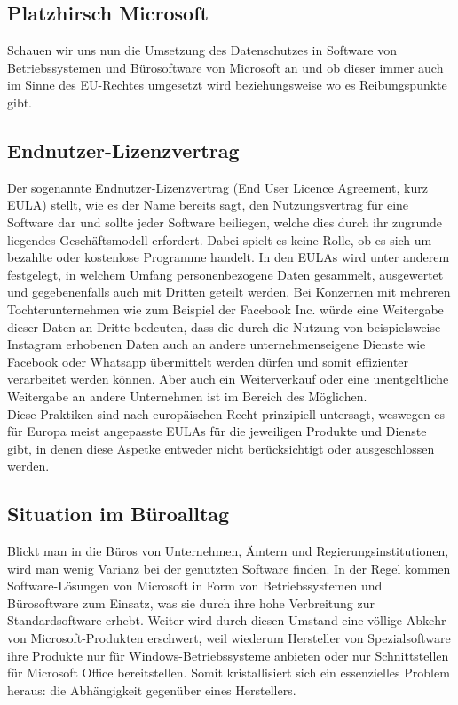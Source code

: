 \subsection{Platzhirsch Microsoft}
Schauen wir uns nun die Umsetzung des Datenschutzes in Software von Betriebssystemen und Bürosoftware von Microsoft an und ob dieser immer auch im Sinne des EU-Rechtes umgesetzt wird beziehungsweise wo es Reibungspunkte gibt.

\subsection{Endnutzer-Lizenzvertrag}
Der sogenannte Endnutzer-Lizenzvertrag (\glqq End User Licence Agreement\grqq{}, kurz EULA) stellt, wie es der Name bereits sagt, den Nutzungsvertrag für eine Software dar und sollte jeder Software beiliegen, welche dies durch ihr zugrunde liegendes Geschäftsmodell erfordert. Dabei spielt es keine Rolle, ob es sich um bezahlte oder kostenlose Programme handelt. In den \mbox{EULAs} wird unter anderem festgelegt, in welchem Umfang personenbezogene Daten gesammelt, ausgewertet und gegebenenfalls auch mit Dritten geteilt werden. Bei Konzernen mit mehreren Tochterunternehmen wie zum Beispiel der Facebook Inc. würde eine Weitergabe dieser Daten an Dritte bedeuten, dass die durch die Nutzung von beispielsweise Instagram erhobenen Daten auch an andere unternehmenseigene Dienste wie Facebook oder Whatsapp übermittelt werden dürfen und somit effizienter verarbeitet werden können. Aber auch ein Weiterverkauf oder eine unentgeltliche Weitergabe an andere Unternehmen ist im Bereich des Möglichen.\\
Diese Praktiken sind nach europäischen Recht prinzipiell untersagt, weswegen es für Europa meist angepasste EULAs für die jeweiligen Produkte und Dienste gibt, in denen diese Aspetke entweder nicht berücksichtigt oder ausgeschlossen werden.

\subsection{Situation im Büroalltag}
Blickt man in die Büros von Unternehmen, Ämtern und Regierungsinstitutionen, wird man wenig Varianz bei der genutzten Software finden. In der Regel kommen Software-Lösungen von Microsoft in Form von Betriebssystemen und Bürosoftware zum Einsatz, was sie durch ihre hohe Verbreitung zur Standardsoftware erhebt. Weiter wird durch diesen Umstand eine völlige Abkehr von Microsoft-Produkten erschwert, weil wiederum Hersteller von Spezialsoftware ihre Produkte nur für Windows-Betriebssysteme anbieten oder nur Schnittstellen für Microsoft Office bereitstellen. Somit kristallisiert sich ein essenzielles Problem heraus: die Abhängigkeit gegenüber eines Herstellers.


